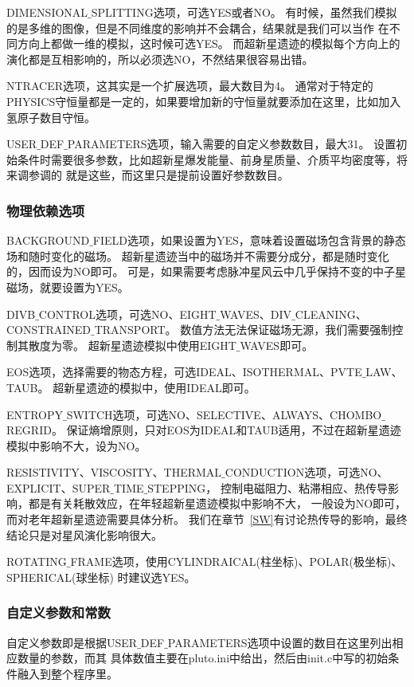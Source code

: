 DIMENSIONAL$\_$SPLITTING选项，可选YES或者NO。
有时候，虽然我们模拟的是多维的图像，但是不同维度的影响并不会耦合，结果就是我们可以当作
在不同方向上都做一维的模拟，这时候可选YES。
而超新星遗迹的模拟每个方向上的演化都是互相影响的，所以必须选NO，不然结果很容易出错。

NTRACER选项，这其实是一个扩展选项，最大数目为4。
通常对于特定的PHYSICS守恒量都是一定的，如果要增加新的守恒量就要添加在这里，比如加入
氢原子数目守恒。

USER$\_$DEF$\_$PARAMETERS选项，输入需要的自定义参数数目，最大31。
设置初始条件时需要很多参数，比如超新星爆发能量、前身星质量、介质平均密度等，将来调参调的
就是这些，而这里只是提前设置好参数数目。

\subsubsection{物理依赖选项}
BACKGROUND$\_$FIELD选项，如果设置为YES，意味着设置磁场包含背景的静态场和随时变化的磁场。
超新星遗迹当中的磁场并不需要分成分，都是随时变化的，因而设为NO即可。
可是，如果需要考虑脉冲星风云中几乎保持不变的中子星磁场，就要设置为YES。

DIVB$\_$CONTROL选项，可选NO、EIGHT$\_$WAVES、DIV$\_$CLEANING、CONSTRAINED$\_$TRANSPORT。
数值方法无法保证磁场无源，我们需要强制控制其散度为零。
超新星遗迹模拟中使用EIGHT$\_$WAVES即可。

EOS选项，选择需要的物态方程，可选IDEAL、ISOTHERMAL、PVTE$\_$LAW、TAUB。
超新星遗迹的模拟中，使用IDEAL即可。

ENTROPY$\_$SWITCH选项，可选NO、SELECTIVE、ALWAYS、CHOMBO$\_$REGRID。
保证熵增原则，只对EOS为IDEAL和TAUB适用，不过在超新星遗迹模拟中影响不大，设为NO。

RESISTIVITY、VISCOSITY、THERMAL$\_$CONDUCTION选项，可选NO、EXPLICIT、SUPER$\_$TIME$\_$STEPPING，
控制电磁阻力、粘滞相应、热传导影响，都是有关耗散效应，在年轻超新星遗迹模拟中影响不大，
一般设为NO即可，而对老年超新星遗迹需要具体分析。
我们在章节~\ref{SW}有讨论热传导的影响，最终结论只是对星风演化影响很大。

ROTATING$\_$FRAME选项，使用CYLINDRAICAL(柱坐标)、POLAR(极坐标)、SPHERICAL(球坐标)
时建议选YES。

\subsubsection{自定义参数和常数}
自定义参数即是根据USER$\_$DEF$\_$PARAMETERS选项中设置的数目在这里列出相应数量的参数，而其
具体数值主要在pluto.ini中给出，然后由init.c中写的初始条件融入到整个程序里。

